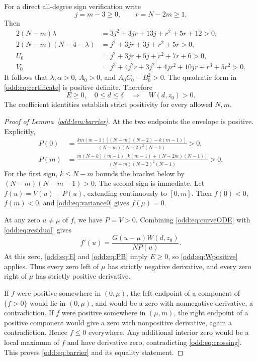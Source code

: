 For a direct all-degree sign verification write
\[
 j=m-3\ge0,\qquad r=N-2m\ge1.
\]
Then
\begin{align}
 2(N-m)\lambda
 &=3j^2+3jr+13j+r^2+5r+12>0,\label{odd:eq:lambda_pos}\\
 2(N-m)(N-4-\lambda)
 &=j^2+3jr+3j+r^2+5r>0,\label{odd:eq:alpha_pos}\\
 U_0&=j^2+3jr+5j+r^2+7r+6>0,\label{odd:eq:U_pos}\\
 V_0&=j^3+4j^2r+3j^2+4jr^2+10jr+r^3+5r^2>0.\label{odd:eq:V_pos}
\end{align}
It follows that $\lambda,\alpha>0$, $A_0>0$, and $A_0C_0-B_0^2>0$.
The quadratic form in \eqref{odd:eq:certificate} is positive definite. Therefore
\begin{equation}\label{odd:eq:Wpositive}
 E\ge0,\quad 0\le d\le\delta\quad\Longrightarrow\quad W(d,z_0)>0.
\end{equation}
The coefficient identities establish strict positivity for every allowed $N,m$.

\begin{proof}[Proof of Lemma~\ref{odd:lem:barrier}]
At the two endpoints the envelope is positive. Explicitly,
\begin{align}
 P(0)&=\frac{km(m-1)[(N-m)(N-2)-k(m-1)]}
 {(N-m)(N-2)^2(N-1)}>0,\label{odd:eq:end0}\\
 P(m)&=\frac{m(N-k)(m-1)[k(m-1)+(N-2m)(N-1)]}
 {(N-m)(N-2)^2(N-1)}>0.\label{odd:eq:endm}
\end{align}
For the first sign, $k\le N-m$ bounds the bracket below by
$(N-m)(N-m-1)>0$. The second sign is immediate.
Let $f(u)=V(u)-P(u)$, extending continuously to $[0,m]$.
Then $f(0)<0$, $f(m)<0$, and \eqref{odd:eq:variance0} gives $f(\mu)=0$.

At any zero $u\ne\mu$ of $f$, we have $P=V>0$. Combining
\eqref{odd:eq:curveODE} with \eqref{odd:eq:residual} gives
\begin{equation}\label{odd:eq:crossing}
 f'(u)=\frac{G(u-\mu)W(d,z_0)}{NP(u)}.
\end{equation}
At this zero, \eqref{odd:eq:E} and \eqref{odd:eq:PB} imply $E\ge0$, so
\eqref{odd:eq:Wpositive} applies. Thus every zero left of $\mu$ has strictly negative derivative, and every zero right of $\mu$ has strictly positive derivative.

If $f$ were positive somewhere in $(0,\mu)$, the left endpoint of a component of $\{f>0\}$ would lie in $(0,\mu)$, and would be a zero with nonnegative derivative, a contradiction. If $f$ were positive somewhere in $(\mu,m)$, the right endpoint of a positive component would give a zero with nonpositive derivative, again a contradiction. Hence $f\le0$ everywhere. Any additional interior zero would be a local maximum of $f$ and have derivative zero, contradicting \eqref{odd:eq:crossing}. This proves \eqref{odd:eq:barrier} and its equality statement.
\end{proof}

